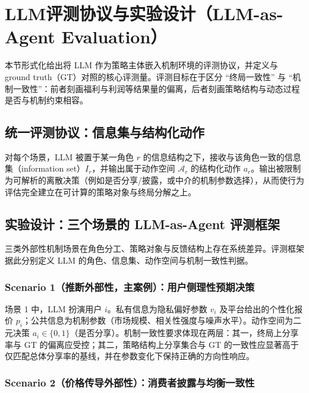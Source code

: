 \section{LLM评测协议与实验设计（LLM-as-Agent Evaluation）}
\label{sec:evaluation}

本节形式化给出将 LLM 作为策略主体嵌入机制环境的评测协议，并定义与 ground truth（GT）对照的核心评测量。评测目标在于区分 ``终局一致性'' 与 ``机制一致性''：前者刻画福利与利润等结果量的偏离，后者刻画策略结构与动态过程是否与机制约束相容。

\subsection{统一评测协议：信息集与结构化动作}
\label{subsec:protocol}

对每个场景，LLM 被置于某一角色 $r$ 的信息结构之下，接收与该角色一致的信息集（information set）$I_r$，并输出属于动作空间 $\mathcal{A}_r$ 的结构化动作 $a_r$。输出被限制为可解析的离散决策（例如是否分享/披露，或中介的机制参数选择），从而使行为评估完全建立在可计算的策略对象与终局分解之上。

\subsection{实验设计：三个场景的 LLM-as-Agent 评测框架}
\label{subsec:design}

三类外部性机制场景在角色分工、策略对象与反馈结构上存在系统差异。评测框架据此分别定义 LLM 的角色、信息集、动作空间与机制一致性判据。

\subsubsection{Scenario 1（推断外部性，主案例）：用户侧理性预期决策}
\label{subsec:design-s1}

场景 1 中，LLM 扮演用户 $i$。私有信息为隐私偏好参数 $v_i$ 及平台给出的个性化报价 $p_i$；公共信息为机制参数（市场规模、相关性强度与噪声水平）。动作空间为二元决策 $a_i \in \{0,1\}$（是否分享）。机制一致性要求体现在两层：其一，终局上分享率与 GT 的偏离应受控；其二，策略结构上分享集合与 GT 的一致性应显著高于仅匹配总体分享率的基线，并在参数变化下保持正确的方向性响应。

\subsubsection{Scenario 2（价格传导外部性）：消费者披露与均衡一致性}
\label{subsec:design-s2}

